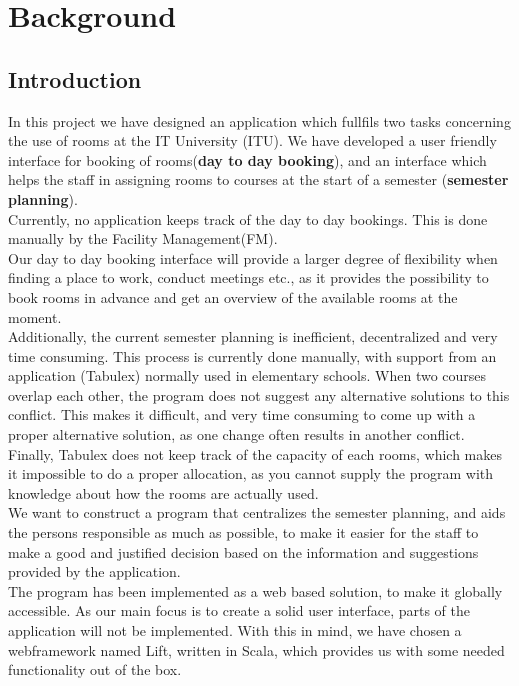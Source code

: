 \chapter{Background}
\section{Introduction}
In this project we have designed an application which fullfils two tasks concerning the use of rooms at the IT University (ITU). We have developed a user friendly interface for booking of rooms(\textbf{day to day booking}), and an interface which helps the staff in assigning rooms to courses at the start of a semester (\textbf{semester planning}).\\

Currently, no application keeps track of the day to day bookings. This is done manually by the Facility Management(FM).\\
Our day to day booking interface will provide a larger degree of flexibility when finding a place to work, conduct meetings etc., as it provides the possibility to book rooms in advance and get an overview of the available rooms at the moment.\\

 Additionally, the current semester planning is inefficient, decentralized and very time consuming. This process is currently done manually, with support from an application (Tabulex) normally used in elementary schools. When two courses overlap each other, the program does not suggest any alternative solutions to this conflict. This makes it difficult, and very time consuming to come up with a proper alternative solution, as one change often results in another conflict.\\
Finally, Tabulex does not keep track of the capacity of each rooms, which makes it impossible to do a proper allocation, as you cannot supply the program with knowledge about how the rooms are actually used.\\
We want to construct a program that centralizes the semester planning, and aids the persons responsible as much as possible, to make it easier for the staff to make a good and justified decision based on the information and suggestions provided by the application. \\

The program has been implemented as a web based solution, to make it globally accessible. As our main focus is to create a solid user interface, parts of the application will not be implemented. With this in mind, we have chosen a webframework named Lift, written in Scala, which provides us with some needed functionality out of the box.

